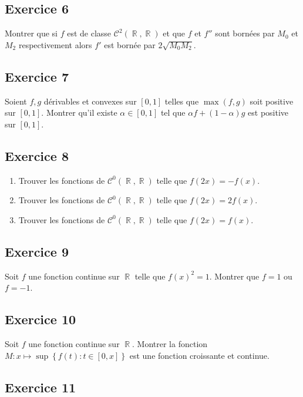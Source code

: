 \documentclass{article}
\DeclareMathOperator{\R}{\mathbb{R}}
\begin{document}
\subsection*{Exercice 6} 

Montrer que si $f$ est de classe $\mathcal{C}^2(\R, \R)$ et que $f$ et $f''$ sont bornées par $M_0$ et $M_2$ respectivement alors $f'$ est bornée par $2\sqrt{M_0M_2}$. 

\subsection*{Exercice 7} 

Soient $f, g$ dérivables et convexes sur $[0, 1]$ telles que $\max(f, g)$ soit positive sur $[0, 1]$. Montrer qu'il existe $\alpha \in [0, 1]$ tel que $\alpha f + (1-\alpha)g $ est positive sur $[0, 1]$. 

\subsection*{Exercice 8} 

\begin{enumerate}    
\item Trouver les fonctions de $\mathcal{C}^0(\R, \R)$ telle que $f(2x) = -f(x)$. 

\item Trouver les fonctions de $\mathcal{C}^0(\R, \R)$ telle que $f(2x) = 2f(x)$. 

\item Trouver les fonctions de $\mathcal{C}^0(\R, \R)$ telle que $f(2x) = f(x)$. 
\end{enumerate}
\subsection*{Exercice 9} 

Soit $f$ une fonction continue sur $\R$ telle que $f(x)^2 = 1$. Montrer que $f=1$ ou $f=-1$. 

\subsection*{Exercice 10} 

Soit $f$ une fonction continue sur $\R$. Montrer la fonction $M : x \mapsto \sup\left\{f(t) : t\in [0, x]\right\}$ est une fonction croissante et continue. 

\subsection*{Exercice 11} 
\end{document}
